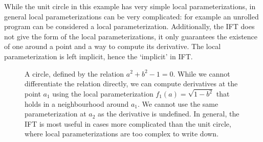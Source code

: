 \documentclass[11pt]{article}
\begin{document}
While the unit circle in this example has very simple local parameterizations,
in general local parameterizations can be very complicated: for example
an unrolled program can be considered a local parameterization.
Additionally, the IFT does not give the form of the local parameterizations,
it only guarantees the existence of one around a point and a way to compute its derivative.
The local parameterization is left implicit, hence the `implicit' in IFT.

\begin{figure}
\centering
{}
\caption{
\label{fig:circle}
A circle, defined by the relation $a^2 + b^2 - 1 = 0$.
While we cannot differentiate the relation directly,
we can compute derivatives at the point $a_1$ using the local parameterization $f_1(a)=\sqrt{1-b^2}$ that holds
in a neighbourhood around $a_1$.
We cannot use the same parameterization at $a_2$ as the derivative is undefined.
In general, the IFT is most useful in cases more complicated than the unit circle,
where local parameterizations are too complex to write down.
}
\end{figure}
\end{document}
